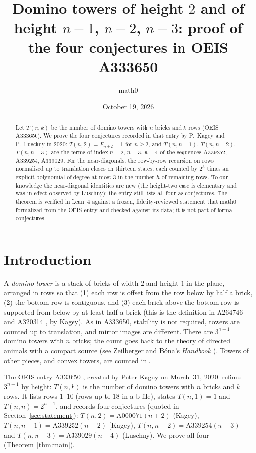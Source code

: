 \documentclass[11pt]{amsart}
\title[Domino towers by height (OEIS A333650)]{Domino towers of height $2$ and of height $n-1$, $n-2$, $n-3$: proof of the four conjectures in OEIS A333650}
\author{math0}
\date{October 19, 2026}
\theoremstyle{plain}
\theoremstyle{definition}
\begin{document}
\begin{abstract}
Let $T(n,k)$ be the number of domino towers with $n$ bricks and $k$ rows (OEIS A333650).
We prove the four conjectures recorded in that entry by P.~Kagey and P.~Luschny in 2020: $T(n,2)=F_{n+2}-1$ for $n\ge2$, and $T(n,n-1)$, $T(n,n-2)$, $T(n,n-3)$ are the terms of index $n-2$, $n-3$, $n-4$ of the sequences A339252, A339254, A339029.
For the near-diagonals, the row-by-row recursion on rows normalized up to translation closes on thirteen states, each counted by $2^h$ times an explicit polynomial of degree at most $3$ in the number $h$ of remaining rows.
To our knowledge the near-diagonal identities are new (the height-two case is elementary and was in effect observed by Luschny); the entry still lists all four as conjectures.
The theorem is verified in Lean~4 against a frozen, fidelity-reviewed statement that math0 formalized from the OEIS entry and checked against its data; it is not part of formal-conjectures.
\end{abstract}
\maketitle

\section{Introduction}

A \emph{domino tower} is a stack of bricks of width $2$ and height $1$ in the plane, arranged in rows so that (1) each row is offset from the row below by half a brick, (2) the bottom row is contiguous, and (3) each brick above the bottom row is supported from below by at least half a brick (this is the definition in A264746 and A320314 \cite{A264746}, by Kagey). As in A333650, stability is not required, towers are counted up to translation, and mirror images are different.
There are $3^{n-1}$ domino towers with $n$ bricks; the count goes back to the theory of directed animals with a compact source \cite{GBV,BP} (see Zeilberger \cite{Z} and Bóna's \emph{Handbook} \cite[pp.~25--27]{Bona}). Towers of other pieces, and convex towers, are counted in \cite{EZ,Br1,Br2,Ha}.

The OEIS entry A333650 \cite{A333650}, created by Peter Kagey on March~31, 2020, refines $3^{n-1}$ by height: $T(n,k)$ is the number of domino towers with $n$ bricks and $k$ rows. It lists rows $1$--$10$ (rows up to $18$ in a b-file), states $T(n,1)=1$ and $T(n,n)=2^{n-1}$, and records four conjectures (quoted in Section~\ref{sec:statement}): $T(n,2)=\mathrm{A000071}(n+2)$ (Kagey), $T(n,n-1)=\mathrm{A339252}(n-2)$ (Kagey), $T(n,n-2)=\mathrm{A339254}(n-3)$ and $T(n,n-3)=\mathrm{A339029}(n-4)$ (Luschny). We prove all four (Theorem~\ref{thm:main}).
\end{document}
